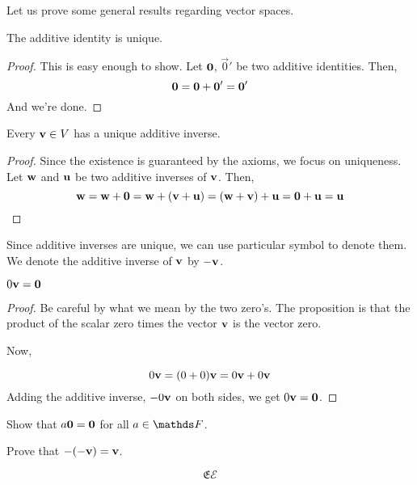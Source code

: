 Let us prove some general results regarding vector spaces. 

\begin{proposition}
    The additive identity is unique.
\end{proposition}

\begin{proof}
    This is easy enough to show. Let \(\boldsymbol{\mathbf{0}}\), \(\vec{0}'\) be two additive identities.
    Then, 
    \begin{equation*}
        \boldsymbol{\mathbf{0}} = \boldsymbol{\mathbf{0}} + \boldsymbol{\mathbf{0}}' = \boldsymbol{\mathbf{0}}'
    \end{equation*}
    And we're done.
\end{proof}

\begin{proposition}
    Every \(\boldsymbol{\mathbf{v}} \in V\) has a unique additive inverse.
\end{proposition}

\begin{proof}
    Since the existence is guaranteed by the axioms, we focus on uniqueness.
    Let \(\boldsymbol{\mathbf{w}}\) and \(\boldsymbol{\mathbf{u}}\) be two additive inverses of \(\boldsymbol{\mathbf{v}}\). Then,
    \begin{equation*}
        \boldsymbol{\mathbf{w}} = \boldsymbol{\mathbf{w}} + \boldsymbol{\mathbf{0}} = \boldsymbol{\mathbf{w}} + (\boldsymbol{\mathbf{v}} + \boldsymbol{\mathbf{u}}) = (\boldsymbol{\mathbf{w}} + \boldsymbol{\mathbf{v}}) + \boldsymbol{\mathbf{u}} = \boldsymbol{\mathbf{0}} + \boldsymbol{\mathbf{u}} = \boldsymbol{\mathbf{u}} 
    \end{equation*}
\end{proof}

Since additive inverses are unique, we can use particular symbol to denote them. We denote 
the additive inverse of \(\boldsymbol{\mathbf{v}}\) by \(-\boldsymbol{\mathbf{v}}\). 

\begin{proposition}
    \(0\boldsymbol{\mathbf{v}} = \boldsymbol{\mathbf{0}}\)
\end{proposition}

\begin{proof}
    Be careful by what we mean by the two zero's. The proposition is that the 
    product of the scalar zero times the vector \(\boldsymbol{\mathbf{v}}\) is the vector zero.

    Now,

    \begin{equation*}
        0\boldsymbol{\mathbf{v}} = (0 + 0)\boldsymbol{\mathbf{v}} = 0\boldsymbol{\mathbf{v}} + 0\boldsymbol{\mathbf{v}}
    \end{equation*}
    Adding the additive inverse, \(-0\boldsymbol{\mathbf{v}}\) on both sides, we get \(0\boldsymbol{\mathbf{v}} = \boldsymbol{\mathbf{0}}\).
\end{proof}

\begin{exc}
    \begin{exercise}[points = 1]
        Show that \(a\boldsymbol{\mathbf{0}} = \boldsymbol{\mathbf{0}}\) for all \(a \in \FF\).
    \end{exercise}
    \begin{exercise}[points = 1]
        Prove that \(-(-\boldsymbol{\mathbf{v}}) = \boldsymbol{\mathbf{v}}\).
    \end{exercise}
\end{exc}

\[\mathfrak{E} \mathcal{E}\]